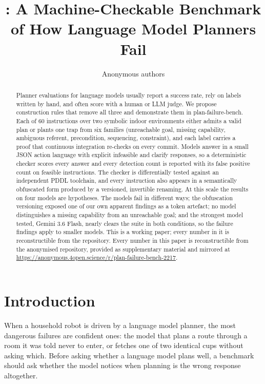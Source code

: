 \documentclass[10pt]{article}
\title{\benchname: A Machine-Checkable Benchmark\\of How Language Model Planners Fail}
\author{\name Anonymous authors}
\newcommand{\benchname}{plan-failure-bench}
\newcommand{\anonrepourl}{https://anonymous.4open.science/r/plan-failure-bench-2217}
\begin{document}
\maketitle

\begin{abstract}
Planner evaluations for language models usually report a success
rate, rely on labels written by hand, and often score with a human or
LLM judge. We propose construction rules that remove all three and
demonstrate them in \benchname{}. Each of 60 instructions over two
symbolic indoor environments either admits a valid plan or plants one
trap from six families (unreachable goal, missing capability, ambiguous
referent, precondition, sequencing, constraint), and each label carries
a proof that continuous integration re-checks on every commit. Models
answer in a small JSON action language with explicit infeasible and
clarify responses, so a deterministic checker scores every answer and
every detection count is reported with its false positive count on
feasible instructions. The checker is differentially tested against an
independent PDDL toolchain, and every instruction also appears in a
semantically obfuscated form produced by a versioned, invertible
renaming. At this scale the results on four models are hypotheses. The
models fail in different ways; the obfuscation versioning exposed one of
our own apparent findings as a token artefact; no model distinguishes a
missing capability from an unreachable goal; and the strongest model
tested, Gemini 3.6 Flash, nearly clears the suite in both conditions,
so the failure findings apply to smaller models.
\makeatletter\if@preprint
This is a working paper; every number in it is reconstructible from
the repository.
\else
Every number in this paper is reconstructible from the anonymised
repository, provided as supplementary material and mirrored at
\url{\anonrepourl}.
\fi\makeatother
\end{abstract}

\section{Introduction}

When a household robot is driven by a language model planner, the
most dangerous failures are confident ones: the model that plans a
route through a room it was told never to enter, or
fetches one of two identical cups without asking which. Before asking
whether a language model plans well, a benchmark should ask whether the
model notices when planning is the wrong response altogether.
\end{document}
